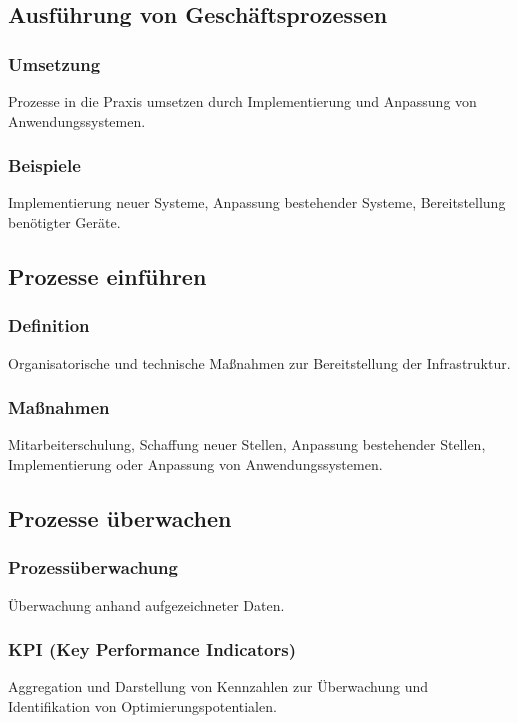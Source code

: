 \subsection{Ausführung von Geschäftsprozessen}
    \subsubsection*{Umsetzung}
        Prozesse in die Praxis umsetzen durch Implementierung und Anpassung von Anwendungssystemen.
    \subsubsection*{Beispiele}
        Implementierung neuer Systeme, Anpassung bestehender Systeme, Bereitstellung benötigter Geräte.

\subsection{Prozesse einführen}
    \subsubsection*{Definition}
        Organisatorische und technische Maßnahmen zur Bereitstellung der Infrastruktur.
    \subsubsection*{Maßnahmen}
        Mitarbeiterschulung, Schaffung neuer Stellen, Anpassung bestehender Stellen, Implementierung oder Anpassung von Anwendungssystemen.

\subsection{Prozesse überwachen}
    \subsubsection*{Prozessüberwachung}
        Überwachung anhand aufgezeichneter Daten.
    \subsubsection*{KPI (Key Performance Indicators)}
        Aggregation und Darstellung von Kennzahlen zur Überwachung und Identifikation von Optimierungspotentialen.